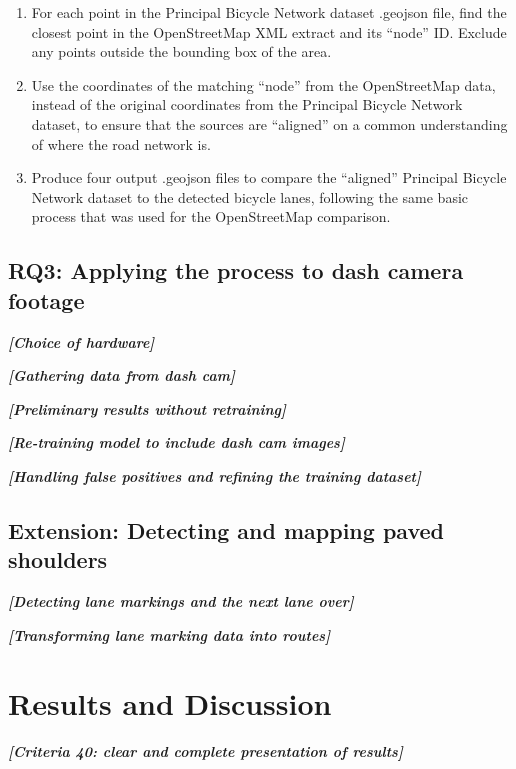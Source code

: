 \documentclass[11pt,twoside]{report}
\newcommand{\remark}[1]{{\bf \em [\marginpar{$\Leftarrow$}#1]}}
\begin{document}
\begin{enumerate}
\item{For each point in the Principal Bicycle Network dataset .geojson file, find the closest point in the OpenStreetMap XML extract and its ``node'' ID.  Exclude any points outside the bounding box of the area.}
\item{Use the coordinates of the matching ``node'' from the OpenStreetMap data, instead of the original coordinates from the Principal Bicycle Network dataset, to ensure that the sources are ``aligned'' on a common understanding  of where the road network is.}
\item{Produce four output .geojson files to compare the ``aligned'' Principal Bicycle Network dataset to the detected bicycle lanes, following the same basic process that was used for the OpenStreetMap comparison.}
\end{enumerate}


\section{RQ3: Applying the process to dash camera footage}
\label{s:rq3}

\remark{Choice of hardware}

\remark{Gathering data from dash cam}

\remark{Preliminary results without retraining}

\remark{Re-training model to include dash cam images}

\remark{Handling false positives and refining the training dataset}


\section{Extension: Detecting and mapping paved shoulders}

\remark{Detecting lane markings and the next lane over}

\remark{Transforming lane marking data into routes}


\chapter{Results and Discussion}

\remark{Criteria 40: clear and complete presentation of results}
\end{document}
